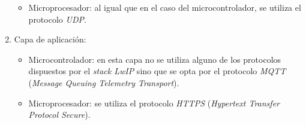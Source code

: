 \begin{enumerate}
\begin{itemize}
      \item Microprocesador: al igual que en el caso del microcontrolador, se utiliza el protocolo \textit{UDP}.

    \end{itemize}
    
  
  \item Capa de aplicación: 

    \begin{itemize}

      \item Microcontrolador: en esta capa no se utiliza alguno de los protocolos dispuestos por el \textit{stack LwIP} sino que se opta por el protocolo \textit{MQTT} (\textit{Message Queuing Telemetry Transport}).

      \item Microprocesador: se utiliza el protocolo \textit{HTTPS} (\textit{Hypertext Transfer Protocol Secure}).

    \end{itemize}



\end{enumerate}

